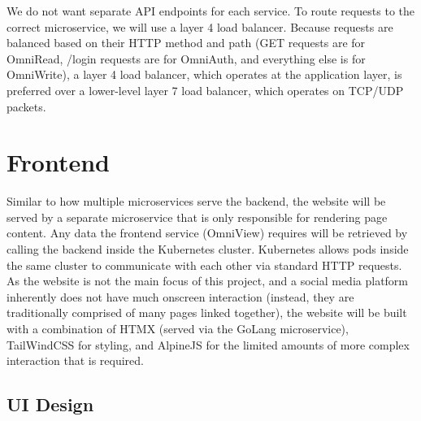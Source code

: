 We do not want separate API endpoints for each service. To route requests to the correct microservice, we will use a layer 4 load balancer. Because requests are balanced based on their HTTP method and path (GET requests are for OmniRead, /login requests are for OmniAuth, and everything else is for OmniWrite), a layer 4 load balancer, which operates at the application layer, is preferred over a lower-level layer 7 load balancer, which operates on TCP/UDP packets.

\section{Frontend}
\label{sec:design-system-frontend}
Similar to how multiple microservices serve the backend, the website will be served by a separate microservice that is only responsible for rendering page content.
Any data the frontend service (OmniView) requires will be retrieved by calling the backend inside the Kubernetes cluster. Kubernetes allows pods inside the same cluster to communicate with each other via standard HTTP requests.
As the website is not the main focus of this project, and a social media platform inherently does not have much onscreen interaction (instead, they are traditionally comprised of many pages linked together), the website will be built with a combination of HTMX (served via the GoLang microservice), TailWindCSS for styling, and AlpineJS for the limited amounts of more complex interaction that is required.


\subsection{UI Design}
\label{sec:design-ui}
